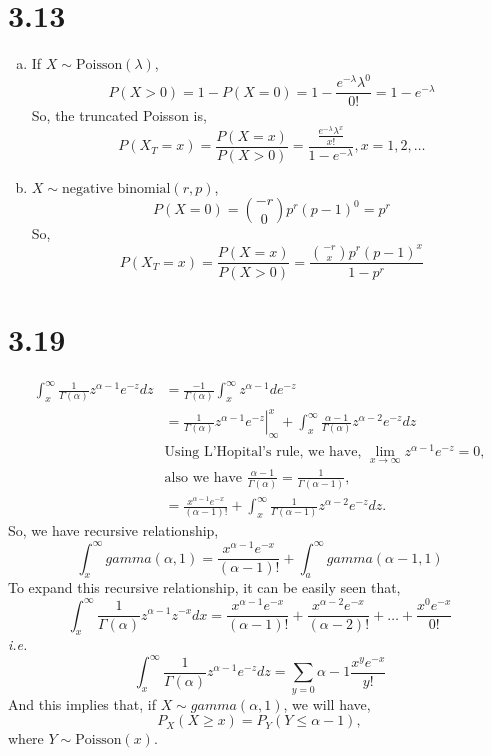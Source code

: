\documentclass[letterpaper]{article}
\begin{document}
    \section*{3.13}
    \begin{enumerate}[(a)]
    \item If $X \sim \text{Poisson}(\lambda)$, 
    \[
    P(X > 0) = 1 - P(X = 0) = 1 - \frac{e^{-\lambda} \lambda^0}{0!} = 1 - e^{-\lambda}
    \]
    So, the truncated Poisson is,
    \[
    P(X_T = x) = \frac{P(X=x)}{P(X > 0)} = \frac{\frac{e^{-\lambda} \lambda^x}{x!}}{1-e^{-\lambda}}, x = 1, 2, \dots
    \]
    \item $X \sim \text{negative binomial}(r, p)$,
    \[
    P(X = 0) = \binom{-r}{0} p^r(p-1)^0 = p^r
    \]
    So,
    \[
    P(X_T = x) = \frac{P(X=x)}{P(X > 0)} = \frac{\binom{-r}{x} p^r (p-1)^x}{1-p^r}
    \]
    \end{enumerate}

    \section*{3.19}
    \begin{align*}
    \int_x^\infty \frac{1}{\Gamma(\alpha)} z^{\alpha-1} e^{-z} dz & =
    \frac{-1}{\Gamma(\alpha)} \int_x^\infty z^{\alpha-1} d e^{-z} \\
    & = \left. \frac{1}{\Gamma(\alpha)} z^{\alpha-1}e^{-z} \right|^x_\infty + 
    \int_x^\infty \frac{\alpha-1}{\Gamma(\alpha)} z^{\alpha-2}e^{-z} dz\\
    & \text{Using L'Hopital's rule, we have, $\lim_{x\to \infty} z^{\alpha-1} e^{-z} = 0$},\\
    & \text{also we have $\frac{\alpha-1}{\Gamma(\alpha)} = \frac{1}{\Gamma(\alpha-1)}$}, \\
    & = \frac{x^{\alpha-1}e^{-x}}{(\alpha-1)!} + \int_x^\infty \frac{1}{\Gamma(\alpha-1)} z^{\alpha-2} e^{-z}dz.
    \end{align*}
    So, we have recursive relationship,
    \[
    \int_x^\infty gamma(\alpha, 1) = \frac{x^{\alpha-1}e^{-x}}{(\alpha-1)!}  + \int_a^\infty gamma(\alpha-1, 1)
    \]
    To expand this recursive relationship, it can be easily seen that,
    \[
    \int_x^\infty \frac{1}{\Gamma(\alpha)} z^{\alpha-1} z^{-x} dx = \frac{x^{\alpha-1}e^{-x}}{(\alpha-1)!} + \frac{x^{\alpha-2}e^{-x}}{(\alpha-2)!} + \dots + \frac{x^{0}e^{-x}}{0!}
    \]
    \emph{i.e.}
    \[
    \int_x^\infty \frac{1}{\Gamma(\alpha)} z^{\alpha-1} e^{-z} dz = \sum_{y=0}{\alpha-1} \frac{x^y e^{-x}}{y!}
    \]
    And this implies that, if $X \sim gamma(\alpha, 1)$, we will have,
    \[
    P_X(X \ge x) = P_Y(Y \le \alpha-1),
    \]
    where $Y \sim \text{Poisson}(x)$.
\end{document}
